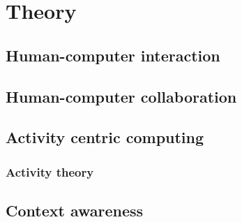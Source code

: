 
\chapter{Theory} %

\label{Theory} %


\section{Human-computer interaction}

\section{Human-computer collaboration}

\section{Activity centric computing}

\subsection{Activity theory}

\section{Context awareness}

